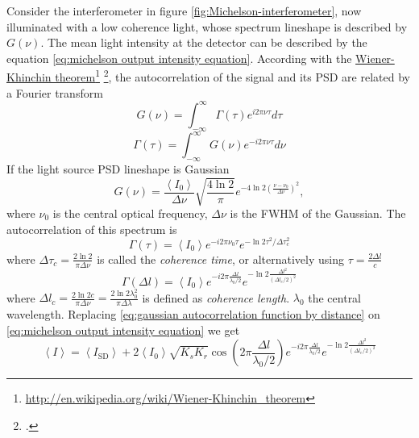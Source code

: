 \documentclass[12pt,twoside,english]{book}
\renewcommand{\~}{\perispomeni}%
\numberwithin{equation}{section}
\numberwithin{figure}{section}
\newcommand\fnurl[2]{%
 \href{#2}{#1}\footnote{\url{#2}}%
}
\begin{document}
Consider the interferometer in figure \ref{fig:Michelson-interferometer}, now illuminated with a low coherence light, whose spectrum lineshape is described by $G\left(\nu\right)$. The mean light intensity at the detector can be described by the equation \ref{eq:michelson output intensity equation}. According with the \fnurl{Wiener-Khinchin theorem}{http://en.wikipedia.org/wiki/Wiener-Khinchin_theorem}\footcite{Goodman:1985p2703}, the autocorrelation of the signal and its \gls{PSD} are related by a Fourier transform
\begin{equation}
G\left(\nu\right)=\int_{-\infty}^{\infty}\Gamma\left(\tau\right)e^{i2\pi\nu\tau}d\tau\label{eq:spectrum from autocorrelation}\end{equation}
\begin{equation}
\Gamma\left(\tau\right)=\int_{-\infty}^{\infty}G\left(\nu\right)e^{-i2\pi\nu\tau}d\nu\label{eq:autocorrelation from spectrum}\end{equation}
If the light source \gls{PSD} lineshape is Gaussian
\begin{equation} G\left(\nu\right)=\frac{\left\langle I_{0}\right\rangle }{\Delta\nu}\sqrt{\frac{4\ln2}{\pi}}e^{-4\ln2\left(\frac{\nu-\nu_{0}}{\Delta\nu}\right)^{2}},\label{eq:gaussian spectrum}\end{equation}
where $\nu_{0}$ is the central optical frequency, $\Delta\nu$ is the \gls{FWHM} of the Gaussian. The autocorrelation of this spectrum is
\begin{equation}
\Gamma\left(\tau\right)=\left\langle I_{0}\right\rangle e^{-i2\pi\nu_{0}\tau}e^{-\ln2\tau^{2}/\Delta\tau_{c}^{2}}\label{eq:gaussian autocorrelation function}\end{equation}
where $\Delta\tau_{c}=\frac{2\ln2}{\pi\Delta\nu}$ is called the \emph{coherence time}, or alternatively using $\tau=\frac{2\Delta l}{c}$
\begin{equation}
\Gamma\left(\Delta l\right)=\left\langle I_{0}\right\rangle e^{-i2\pi\frac{\Delta l}{\lambda_{0}/2}}e^{-\ln2\frac{\Delta l^{2}}{\left(\Delta l_{c}/2\right)^{2}}}\label{eq:gaussian autocorrelation function by distance}\end{equation}
where $\Delta l_{c}=\frac{2\ln2c}{\pi\Delta\nu}=\frac{2\ln2\lambda_{0}^{2}}{\pi\Delta\lambda}$ is defined as \emph{coherence length}. $\lambda_{0}$ the central wavelength. Replacing \ref{eq:gaussian autocorrelation function by distance} on \ref{eq:michelson output intensity equation} we get
\begin{equation} \left\langle I\right\rangle =\left\langle I_{\text{SD}}\right\rangle +2\left\langle I_{0}\right\rangle \sqrt{K_{s}K_{r}}\cos\left(2\pi\frac{\Delta l}{\lambda_{0}/2}\right)e^{-i2\pi\frac{\Delta l}{\lambda_{0}/2}}e^{-\ln2\frac{\Delta l^{2}}{\left(\Delta l_{c}/2\right)^{2}}}\label{eq:gaussianInterferogram}\end{equation}
\end{document}
